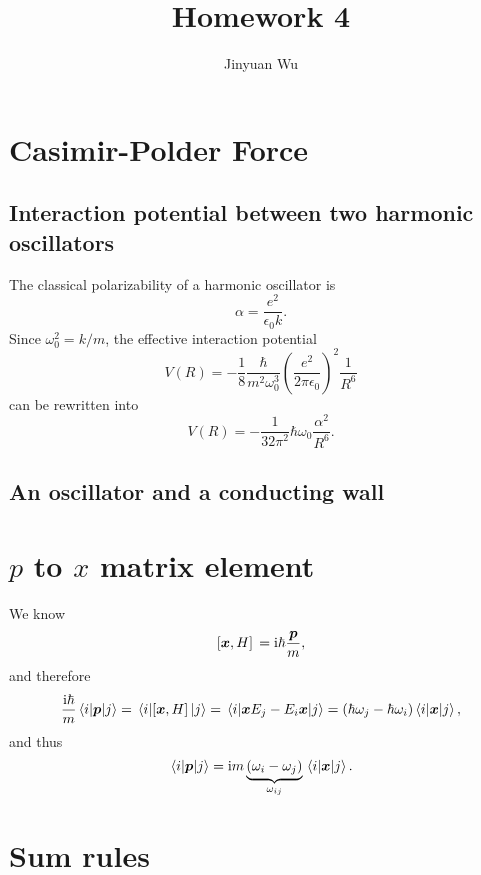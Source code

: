 \documentclass[hyperref, a4paper]{article}
\title{Homework 4}
\author{Jinyuan Wu}
\newcommand*{\ii}{\mathrm{i}}
\begin{document}
\maketitle

\section{Casimir-Polder Force}

\subsection{Interaction potential between two harmonic oscillators}

The classical polarizability of a harmonic oscillator is 
\begin{equation}
    \alpha = \frac{ e^2}{\epsilon_0 k}.
\end{equation}
Since $\omega_0^2 = k / m$, the effective interaction potential 
\begin{equation}
    V(R) = - \frac{1}{8} \frac{\hbar}{m^2 \omega_0^3} \left(\frac{e^2}{2 \pi \epsilon_0}\right)^2 \frac{1}{R^6}
\end{equation}
can be rewritten into 
\begin{equation}
    V(R) = - \frac{1}{32 \pi^2} \hbar \omega_0 \frac{\alpha^2}{R^6}.
\end{equation}

\subsection{An oscillator and a conducting wall}

\section{$p$ to $x$ matrix element}

We know 
\begin{equation}
    \comm*{\vb*{x}}{H} = \ii \hbar \frac{\vb*{p}}{m},
\end{equation}
and therefore 
\[
    \frac{\ii \hbar}{m} \mel{i}{\vb*{p}}{j} = \mel{i}{\comm*{\vb*{x}}{H}}{j}
    = \mel{i}{\vb*{x} E_j - E_i \vb*{x}}{j}
    = (\hbar\omega_j - \hbar \omega_i) \mel{i}{\vb*{x}}{j},
\]
and thus 
\begin{equation}
    \mel{i}{\vb*{p}}{j} = \ii m \underbrace{(\omega_i - \omega_j)}_{\omega_{ij}} \mel{i}{\vb*{x}}{j}.
\end{equation}

\section{Sum rules}
\end{document}
